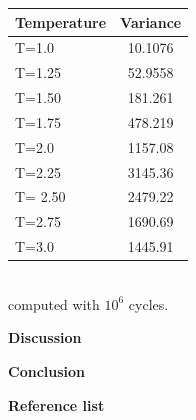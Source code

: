 \documentclass[10pt,a4paper]{article}
\begin{document}
\newpage
\begin{tabular}{|l|c|}
\hline
  Temperature & Variance\\
\hline
  T=1.0 & 10.1076\\
\hline
  T=1.25 & 52.9558\\
\hline
  T=1.50 & 181.261\\
\hline
  T=1.75 & 478.219\\
\hline
  T=2.0 & 1157.08\\
\hline 
  T=2.25 & 3145.36\\
\hline 
  T= 2.50 & 2479.22 \\
\hline 
  T=2.75 & 1690.69\\
\hline
  T=3.0 & 1445.91\\
\hline
\end{tabular}
\\
computed with $10^6$ cycles. 




\newpage
{\LARGE\bf
Discussion 
}










\newpage
{\LARGE\bf
Conclusion
}
















\newpage
{\LARGE\bf
Reference list
}
\end{document}
